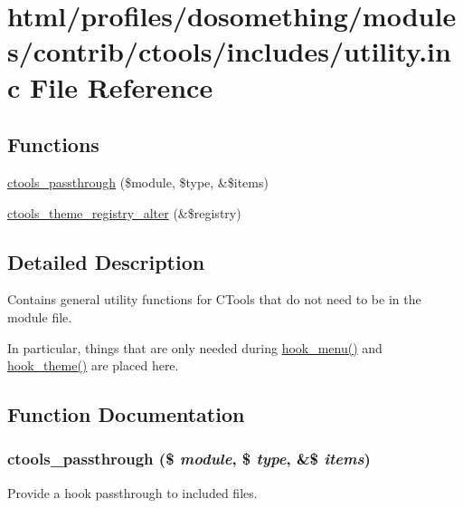 \hypertarget{profiles_2dosomething_2modules_2contrib_2ctools_2includes_2utility_8inc}{
\section{html/profiles/dosomething/modules/contrib/ctools/includes/utility.inc File Reference}
\label{profiles_2dosomething_2modules_2contrib_2ctools_2includes_2utility_8inc}
}
\subsection*{Functions}
\begin{DoxyCompactItemize}
\item 
\hyperlink{profiles_2dosomething_2modules_2contrib_2ctools_2includes_2utility_8inc_ab8a404ad6d650cd47d70cf2d60f7f004}{ctools\_\-passthrough} (\$module, \$type, \&\$items)
\item 
\hyperlink{profiles_2dosomething_2modules_2contrib_2ctools_2includes_2utility_8inc_a556bd4f6f591e705590138bc3d756291}{ctools\_\-theme\_\-registry\_\-alter} (\&\$registry)
\end{DoxyCompactItemize}


\subsection{Detailed Description}
Contains general utility functions for CTools that do not need to be in the module file.

In particular, things that are only needed during \hyperlink{group__hooks_ga5c95244fea59b25666e409759e133ded}{hook\_\-menu()} and \hyperlink{group__hooks_ga013ccb45c7aaab1c16cf9691428c910d}{hook\_\-theme()} are placed here. 

\subsection{Function Documentation}
\hypertarget{profiles_2dosomething_2modules_2contrib_2ctools_2includes_2utility_8inc_ab8a404ad6d650cd47d70cf2d60f7f004}{
\subsubsection[{ctools\_\-passthrough}]{\setlength{\rightskip}{0pt plus 5cm}ctools\_\-passthrough (\$ {\em module}, \/  \$ {\em type}, \/  \&\$ {\em items})}}
\label{profiles_2dosomething_2modules_2contrib_2ctools_2includes_2utility_8inc_ab8a404ad6d650cd47d70cf2d60f7f004}
Provide a hook passthrough to included files.

